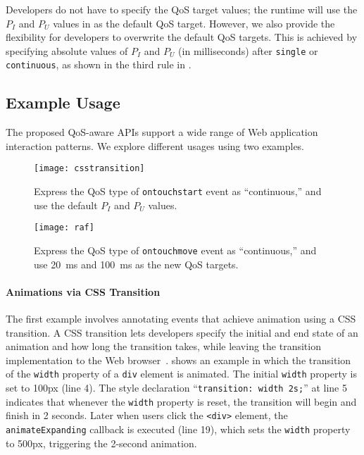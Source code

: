 Developers do not have to specify the QoS target values; the \greenweb runtime will use the $P_I$ and $P_U$ values in  as the default QoS target. However, we also provide the flexibility for developers to overwrite the default QoS targets. This is achieved by specifying absolute values of $P_I$ and $P_U$ (in milliseconds) after \texttt{single} or \texttt{continuous}, as shown in the third rule in .

\subsection{Example Usage}
\label{sec:lang:spec:ex}

The proposed QoS-aware \greenweb APIs support a wide range of Web application interaction patterns. We explore different usages using two examples.

\begin{figure}[t]
  \centering
  \texttt{[image: csstransition]}
  \caption{Express the QoS type of \texttt{ontouchstart} event as ``continuous,'' and use the default $P_I$ and $P_U$ values.}
  \label{fig:csstransition}
\end{figure}

\begin{figure}[t]
  \centering
  \texttt{[image: raf]}
  \caption{Express the QoS type of \texttt{ontouchmove} event as ``continuous,'' and use 20~ms and 100~ms as the new QoS targets.}
  \label{fig:raf}
\end{figure}

\paragraph{Animations via CSS Transition} The first example involves annotating events that achieve animation using a CSS transition. A CSS transition lets developers specify the initial and end state of an animation and how long the transition takes, while leaving the transition implementation to the Web browser~\cite{csstransitions}.  shows an example in which the transition of the \texttt{width} property of a \texttt{div} element is animated. The initial \texttt{width} property is set to 100px (line 4). The style declaration ``\texttt{transition: width 2s;}'' at line 5 indicates that whenever the \texttt{width} property is reset, the transition will begin and finish in 2 seconds. Later when users click the \texttt{<div>} element, the \texttt{animateExpanding} callback is executed (line 19), which sets the \texttt{width} property to 500px, triggering the 2-second animation.

